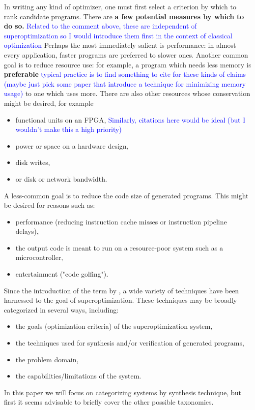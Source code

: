 \documentclass[12pt,twoside]{reedthesis}
\newcommand{\comment}[2]{\textbf{#1} \textcolor{blue}{#2}}
\begin{document}
    In writing any kind of optimizer, one must first select a criterion by which to rank candidate programs.
    There are
        \comment{a few potential measures by which to do so.}{Related to the comment above, these are independent of superoptimization so I would introduce them first in the context of classical optimization}
    Perhaps the most immediately salient is performance: 
        in almost every application, faster programs are preferred to slower ones.
    Another common goal is to reduce resource use: 
        for example, a program which needs less memory is
            \comment{preferable}{typical practice is to find something to cite for these kinds of claims (maybe just pick some paper that introduce a technique for minimizing memory usage)}
            to one which uses more.
    There are also other resources whose conservation might be desired, for example 
    \begin{itemize}
        \item functional units on an FPGA, \comment{}{Similarly, citations here would be ideal (but I wouldn't make this a high priority)}
        \item power or space on a hardware design, 
        \item disk writes, 
        \item or disk or network bandwidth.
    \end{itemize}
    A less-common goal is to reduce the code size of generated programs.
    This might be desired for reasons such as:
    \begin{itemize}
            \item performance (reducing instruction cache misses or instruction pipeline delays), 
            \item the output code is meant to run on a resource-poor system such as a microcontroller, 
            \item entertainment ("code golfing").
    \end{itemize}
    
    
    Since the introduction of the term by \cite{massalin1987superoptimizer}, a wide variety of techniques have been harnessed to the goal of superoptimization.
    These techniques may be broadly categorized in several ways, including:
        \begin{itemize}
            \item the goals (optimization criteria) of the superoptimization system,
            \item the techniques used for synthesis and/or verification of generated programs,
            \item the problem domain,
            \item the capabilities/limitations of the system.
        \end{itemize}
    In this paper we will focus on categorizing systems by synthesis technique, but first it seems advisable to briefly cover the other possible taxonomies.
    
\end{document}

